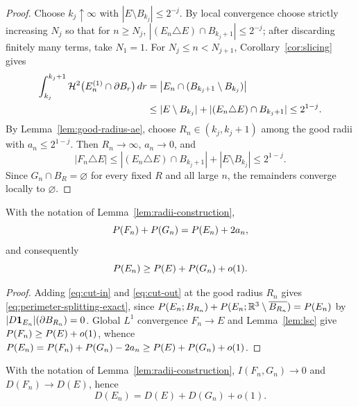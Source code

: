 \begin{proof}
Choose $k_j\uparrow\infty$ with $|E\setminus B_{k_j}|\le2^{-j}$.  By local
convergence choose strictly increasing $N_j$ so that for $n\ge N_j$,
$|(E_n\triangle E)\cap B_{k_j+1}|\le2^{-j}$; after discarding finitely many
terms, take $N_1=1$.  For $N_j\le n<N_{j+1}$,
Corollary~\ref{cor:slicing} gives
\[
\begin{aligned}
  \int_{k_j}^{k_j+1}\mathcal H^2\bigl(E_n^{(1)}\cap\partial B_r\bigr)\,dr
  &=\bigl|E_n\cap(B_{k_j+1}\setminus B_{k_j})\bigr|\\
  &\le|E\setminus B_{k_j}|+|(E_n\triangle E)\cap B_{k_j+1}|\le2^{1-j}.
\end{aligned}
\]
By Lemma~\ref{lem:good-radius-ae}, choose $R_n\in(k_j,k_j+1)$ among the good
radii with $a_n\le2^{1-j}$.  Then $R_n\to\infty$, $a_n\to0$, and
\[
  |F_n\triangle E|
  \le|(E_n\triangle E)\cap B_{k_j+1}|+|E\setminus B_{k_j}|\le2^{1-j}.
\]
Since $G_n\cap B_R=\varnothing$ for every fixed $R$ and all large $n$, the
remainders converge locally to $\varnothing$.
\end{proof}

\begin{lemma}\label{lem:perimeter-splitting}
With the notation of Lemma~\ref{lem:radii-construction},
\begin{equation}\label{eq:perimeter-splitting-exact}
  P(F_n)+P(G_n)=P(E_n)+2a_n ,
\end{equation}
and consequently
\[
  P(E_n)\ge P(E)+P(G_n)+o(1).
\]
\end{lemma}

\begin{proof}
Adding \eqref{eq:cut-in} and \eqref{eq:cut-out} at the good radius $R_n$ gives
\eqref{eq:perimeter-splitting-exact}, since
$P(E_n;B_{R_n})+P(E_n;\mathbb R^3\setminus\overline{B_{R_n}})=P(E_n)$ by
$|D\mathbf 1_{E_n}|(\partial B_{R_n})=0$.  Global $L^1$ convergence
$F_n\to E$ and Lemma~\ref{lem:lsc} give
$P(F_n)\ge P(E)+o(1)$, whence
$P(E_n)=P(F_n)+P(G_n)-2a_n\ge P(E)+P(G_n)+o(1)$.
\end{proof}

\begin{lemma}\label{lem:coulomb-splitting}
With the notation of Lemma~\ref{lem:radii-construction},
$I(F_n,G_n)\to0$ and $D(F_n)\to D(E)$, hence
\[
  D(E_n)=D(E)+D(G_n)+o(1).
\]
\end{lemma}

